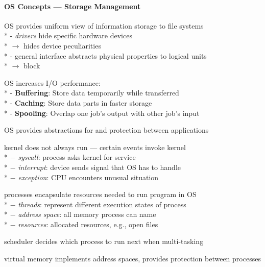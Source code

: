 \paragraph{OS Concepts --- Storage Management}
\begin{items}
	\item OS provides uniform view of information storage to file systems \\*
		- \emph{drivers} hide specific hardware devices \\* \phantom{-} \( \to \) hides device peculiarities \\*
		- general interface abstracts physical properties to logical units \\* \phantom{-} \( \to \) block
	\item OS increases I/O performance: \\*
		- \textbf{Buffering}: Store data temporarily while transferred \\*
		- \textbf{Caching}: Store data parts in faster storage \\*
		- \textbf{Spooling}: Overlap one job's output with other job's input
\end{items}

\begin{summary}
	\begin{items}
		\item OS provides abstractions for and protection between applications
		\item kernel does not always run --- certain events invoke kernel \\*
			$ - $ \emph{syscall}: process asks kernel for service \\*
			$ - $ \emph{interrupt}: device sends signal that OS has to handle \\*
			$ - $ \emph{exception}: CPU encounters unusual situation
		\item processes encapsulate resources needed to run program in OS \\*
			$ - $ \emph{threads}: represent different execution states of process \\*
			$ - $ \emph{address space}: all memory process can name \\*
			$ - $ \emph{resources}: allocated resources, e.g., open files
		\item scheduler decides which process to run next when multi-tasking
		\item virtual memory implements address spaces, provides protection between processes
	\end{items}
\end{summary}